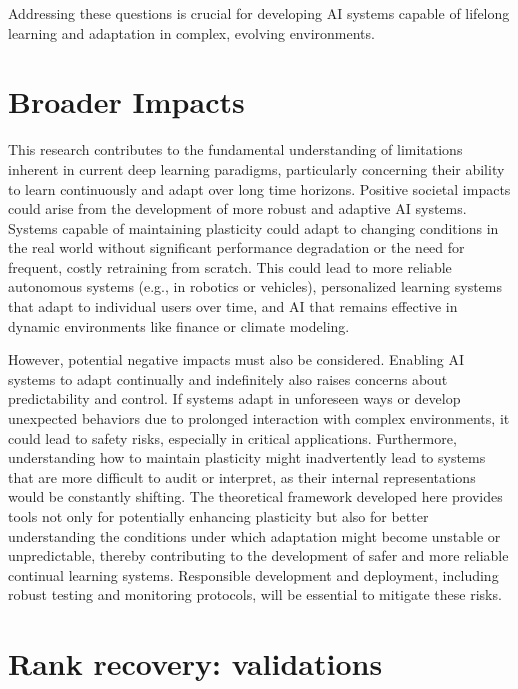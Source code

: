 \documentclass{article}
\begin{document}
Addressing these questions is crucial for developing AI systems capable of lifelong learning and adaptation in complex, evolving environments.

\section{Broader Impacts}
This research contributes to the fundamental understanding of limitations inherent in current deep learning paradigms, particularly concerning their ability to learn continuously and adapt over long time horizons. Positive societal impacts could arise from the development of more robust and adaptive AI systems. Systems capable of maintaining plasticity could adapt to changing conditions in the real world without significant performance degradation or the need for frequent, costly retraining from scratch. This could lead to more reliable autonomous systems (e.g., in robotics or vehicles), personalized learning systems that adapt to individual users over time, and AI that remains effective in dynamic environments like finance or climate modeling.

However, potential negative impacts must also be considered. Enabling AI systems to adapt continually and indefinitely also raises concerns about predictability and control. If systems adapt in unforeseen ways or develop unexpected behaviors due to prolonged interaction with complex environments, it could lead to safety risks, especially in critical applications. Furthermore, understanding how to maintain plasticity might inadvertently lead to systems that are more difficult to audit or interpret, as their internal representations would be constantly shifting. The theoretical framework developed here provides tools not only for potentially enhancing plasticity but also for better understanding the conditions under which adaptation might become unstable or unpredictable, thereby contributing to the development of safer and more reliable continual learning systems. Responsible development and deployment, including robust testing and monitoring protocols, will be essential to mitigate these risks.



\appendix

\section{Rank recovery: validations }
\label{app:additional_empirical_evidence}
\end{document}
